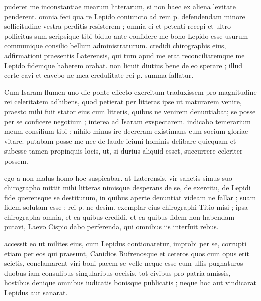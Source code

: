 


 puderet me inconstantiae mearum litterarum, si non haec ex aliena levitate penderent. omnia feci qua re Lepido coniuncto ad rem p. defendendam minore sollicitudine vestra perditis resisterem ; omnia ei et petenti recepi et ultro pollicitus sum scripsique tibi biduo ante confidere me bono Lepido esse usurum communique consilio bellum administraturum. credidi chirographis eius, adfirmationi praesentis Laterensis, qui tum apud me erat reconciliaremque me Lepido fidemque haberem orabat. non licuit diutius bene de eo sperare ; illud certe cavi et cavebo ne mea credulitate rei p. summa fallatur.

 Cum Isaram flumen uno die ponte effecto exercitum traduxissem pro magnitudine rei celeritatem adhibens, quod petierat per litteras ipse ut maturarem venire, praesto mihi fuit stator eius cum litteris, quibus ne venirem denuntiabat; se posse per se conficere negotium ; interea ad Isaram exspectarem. indicabo temerarium meum consilium tibi : nihilo minus ire decreram existimans eum socium gloriae vitare. putabam posse me nec de laude ieiuni hominis delibare quicquam et subesse tamen propinquis locis, ut, si durius aliquid esset, succurrere celeriter possem.

 ego a non malus homo hoc suspicabar. at Laterensis, vir sanctis simus suo chirographo mittit mihi litteras nimisque desperans de se, de exercitu, de Lepidi fide querensque se destitutum, in quibus aperte denuntiat videam ne fallar ; suam fidem solutam esse ; rei p. ne desim. exemplar eius chirographi Titio misi ; ipsa chirographa omnia, et ea quibus credidi, et ea quibus fidem non habendam putavi, Laevo Cispio dabo perferenda, qui omnibus iis interfuit rebus.

 accessit eo ut milites eius, cum Lepidus contionaretur, improbi per se, corrupti etiam per eos qui praesunt, Canidios Rufrenosque et ceteros quos cum opus erit scietis, conclamarent viri boni pacem se velle neque esse cum ullis pugnaturos duobus iam consulibus singularibus occisis, tot civibus pro patria amissis, hostibus denique omnibus iudicatis bonisque publicatis ; neque hoc aut vindicarat Lepidus aut sanarat.

